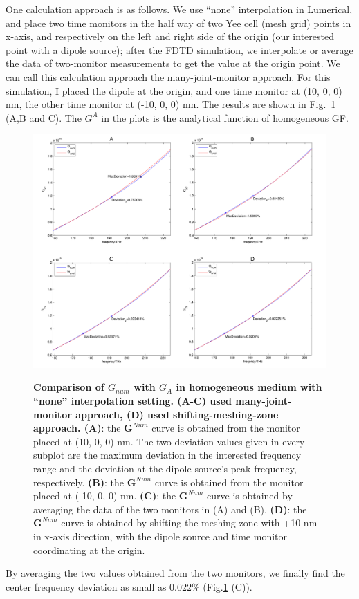 One calculation approach is as follows. We use ``none'' interpolation in Lumerical, and place two time monitors in the half way of two Yee cell (mesh grid) points in x-axis, and respectively on the left and right side of the origin (our interested point with a dipole source); after the FDTD simulation, we interpolate or average the data of two-monitor measurements to get the value at the origin point. We can call this calculation approach the many-joint-monitor approach. For this simulation, I placed the dipole at the origin, and one time monitor at (10, 0, 0) nm, the other time monitor at (-10, 0, 0) nm. The results are shown in Fig.~\ref{Ghom_11_12_13} (A,B and C). The $G^{A}$ in the plots is the analytical function of homogeneous GF.
\begin{figure}[htp]
\centering
\begin{center}
{\includegraphics[width=16cm]{./Figs/Ghom_11_12_13}}
\end{center}
\caption[Comparison of $G_{num}$ with $G_{A}$ in homogeneous medium, in method 1.]{\textbf{Comparison of $G_{num}$ with $G_{A}$ in homogeneous medium with ``none'' interpolation setting. (A-C) used many-joint-monitor approach, (D) used shifting-meshing-zone approach. (A)}: the $\mathbf{G}^{Num}$ curve is obtained from the monitor placed at (10, 0, 0) nm. The two deviation values given in every subplot are the maximum deviation in the interested frequency range and the deviation at the dipole source's peak frequency, respectively. \textbf{(B)}: the $\mathbf{G}^{Num}$ curve is obtained from the monitor placed at (-10, 0, 0) nm. \textbf{(C)}: the $\mathbf{G}^{Num}$ curve is obtained by averaging the data of the two monitors in (A) and (B). \textbf{(D)}: the $\mathbf{G}^{Num}$ curve is obtained by shifting the meshing zone with +10 nm in x-axis direction, with the dipole source and time monitor coordinating at the origin.}
\label{Ghom_11_12_13}
\end{figure}
By averaging the two values obtained from the two monitors, we finally find the center frequency deviation as small as 0.022\% (Fig.\ref{Ghom_11_12_13} (C)).


